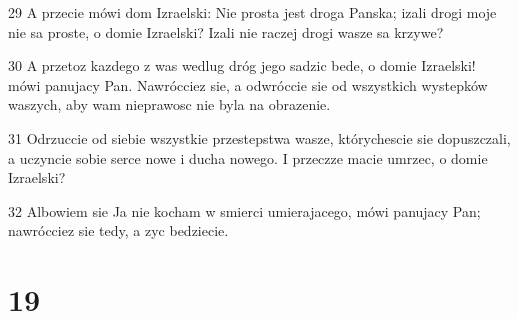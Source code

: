 \par 29 A przecie mówi dom Izraelski: Nie prosta jest droga Panska; izali drogi moje nie sa proste, o domie Izraelski? Izali nie raczej drogi wasze sa krzywe?
\par 30 A przetoz kazdego z was wedlug dróg jego sadzic bede, o domie Izraelski! mówi panujacy Pan. Nawrócciez sie, a odwróccie sie od wszystkich wystepków waszych, aby wam nieprawosc nie byla na obrazenie.
\par 31 Odrzuccie od siebie wszystkie przestepstwa wasze, którychescie sie dopuszczali, a uczyncie sobie serce nowe i ducha nowego. I przeczze macie umrzec, o domie Izraelski?
\par 32 Albowiem sie Ja nie kocham w smierci umierajacego, mówi panujacy Pan; nawrócciez sie tedy, a zyc bedziecie.

\chapter{19}

